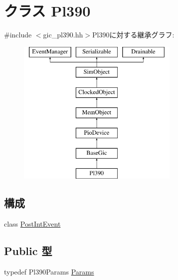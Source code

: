 \hypertarget{classPl390}{
\section{クラス Pl390}
\label{classPl390}
}


{\ttfamily \#include $<$gic\_\-pl390.hh$>$}Pl390に対する継承グラフ:\begin{figure}[H]
\begin{center}
\leavevmode
\includegraphics[height=7cm]{classPl390}
\end{center}
\end{figure}
\subsection*{構成}
\begin{DoxyCompactItemize}
\item 
class \hyperlink{classPl390_1_1PostIntEvent}{PostIntEvent}
\end{DoxyCompactItemize}
\subsection*{Public 型}
\begin{DoxyCompactItemize}
\item 
typedef Pl390Params \hyperlink{classPl390_a1ac197c7f5e1a7b8d7178444a1474e45}{Params}
\end{DoxyCompactItemize}
